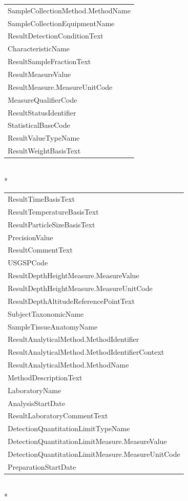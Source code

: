 \documentclass[a4paper,11pt]{article}
\begin{document}
\begin{tabular}{l}
  SampleCollectionMethod.MethodName \\ 
  SampleCollectionEquipmentName \\ 
  ResultDetectionConditionText \\ 
  CharacteristicName \\ 
  ResultSampleFractionText \\ 
  ResultMeasureValue \\ 
  ResultMeasure.MeasureUnitCode \\ 
  MeasureQualifierCode \\ 
  ResultStatusIdentifier \\ 
  StatisticalBaseCode \\ 
  ResultValueTypeName \\ 
  ResultWeightBasisText \\ 
   \hline
\end{tabular}\\*
\newpage
\begin{tabular}{l}
  \hline
  \hline
ResultTimeBasisText \\ 
  ResultTemperatureBasisText \\ 
  ResultParticleSizeBasisText \\ 
  PrecisionValue \\ 
  ResultCommentText \\ 
  USGSPCode \\ 
  ResultDepthHeightMeasure.MeasureValue \\ 
  ResultDepthHeightMeasure.MeasureUnitCode \\ 
  ResultDepthAltitudeReferencePointText \\ 
  SubjectTaxonomicName \\ 
  SampleTissueAnatomyName \\ 
  ResultAnalyticalMethod.MethodIdentifier \\ 
  ResultAnalyticalMethod.MethodIdentifierContext \\ 
  ResultAnalyticalMethod.MethodName \\ 
  MethodDescriptionText \\ 
  LaboratoryName \\ 
  AnalysisStartDate \\ 
  ResultLaboratoryCommentText \\ 
  DetectionQuantitationLimitTypeName \\ 
  DetectionQuantitationLimitMeasure.MeasureValue \\ 
  DetectionQuantitationLimitMeasure.MeasureUnitCode \\ 
  PreparationStartDate \\ 
   \hline
\end{tabular}\\*
\end{document}
